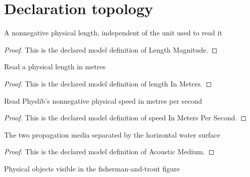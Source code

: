 \section{Declaration topology}
\begin{definition}
  \label{def:physics:phyx-mini-0209:phyxminiproblems-problemphyxmini0209-lengthmagnitude}
  A nonnegative physical length, independent of the unit used to read it
\end{definition}
\begin{proof}
  This is the declared model definition of Length Magnitude.
\end{proof}
\begin{definition}
  \label{def:physics:phyx-mini-0209:phyxminiproblems-problemphyxmini0209-lengthinmeters}
  Read a physical length in metres
\end{definition}
\begin{proof}
  This is the declared model definition of length In Meters.
\end{proof}
\begin{definition}
  \label{def:physics:phyx-mini-0209:phyxminiproblems-problemphyxmini0209-speedinmeterspersecond}
  Read Physlib's nonnegative physical speed in metres per second
\end{definition}
\begin{proof}
  This is the declared model definition of speed In Meters Per Second.
\end{proof}
\begin{definition}
  \label{def:physics:phyx-mini-0209:phyxminiproblems-problemphyxmini0209-acousticmedium}
  The two propagation media separated by the horizontal water surface
\end{definition}
\begin{proof}
  This is the declared model definition of Acoustic Medium.
\end{proof}
\begin{definition}
  \label{def:physics:phyx-mini-0209:phyxminiproblems-problemphyxmini0209-figureobject}
  Physical objects visible in the fisherman-and-trout figure
\end{definition}
